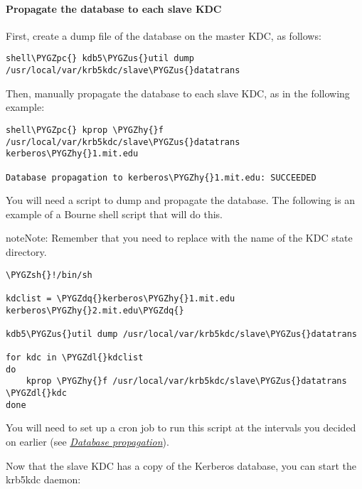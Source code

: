 \documentclass[letterpaper,10pt,english]{sphinxmanual}
\def\PYGZus{\char`\_}
\def\PYGZsh{\char`\#}
\def\PYGZpc{\char`\%}
\def\PYGZdl{\char`\$}
\def\PYGZhy{\char`\-}
\def\PYGZdq{\char`\"}
\begin{document}
\paragraph{Propagate the database to each slave KDC}
\label{admin/install_kdc:kprop-to-slaves}\label{admin/install_kdc:propagate-the-database-to-each-slave-kdc}
First, create a dump file of the database on the master KDC, as
follows:

\begin{Verbatim}[commandchars=\\\{\}]
shell\PYGZpc{} kdb5\PYGZus{}util dump /usr/local/var/krb5kdc/slave\PYGZus{}datatrans
\end{Verbatim}

Then, manually propagate the database to each slave KDC, as in the
following example:

\begin{Verbatim}[commandchars=\\\{\}]
shell\PYGZpc{} kprop \PYGZhy{}f /usr/local/var/krb5kdc/slave\PYGZus{}datatrans kerberos\PYGZhy{}1.mit.edu

Database propagation to kerberos\PYGZhy{}1.mit.edu: SUCCEEDED
\end{Verbatim}

You will need a script to dump and propagate the database. The
following is an example of a Bourne shell script that will do this.

\begin{notice}{note}{Note:}
Remember that you need to replace 
with the name of the KDC state directory.
\end{notice}

\begin{Verbatim}[commandchars=\\\{\}]
\PYGZsh{}!/bin/sh

kdclist = \PYGZdq{}kerberos\PYGZhy{}1.mit.edu kerberos\PYGZhy{}2.mit.edu\PYGZdq{}

kdb5\PYGZus{}util dump /usr/local/var/krb5kdc/slave\PYGZus{}datatrans

for kdc in \PYGZdl{}kdclist
do
    kprop \PYGZhy{}f /usr/local/var/krb5kdc/slave\PYGZus{}datatrans \PYGZdl{}kdc
done
\end{Verbatim}

You will need to set up a cron job to run this script at the intervals
you decided on earlier (see {\hyperref[admin/realm_config:db-prop]{\emph{Database propagation}}}).

Now that the slave KDC has a copy of the Kerberos database, you can
start the krb5kdc daemon:
\end{document}
